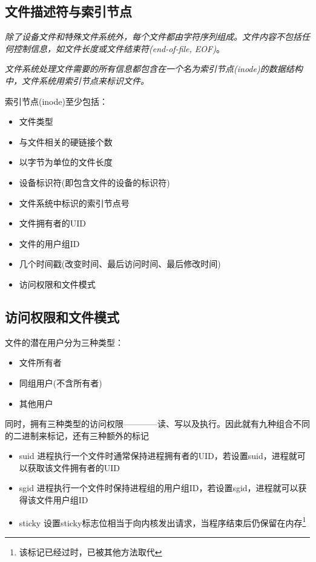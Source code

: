 \subsection{文件描述符与索引节点}

    \emph{除了设备文件和特殊文件系统外，每个文件都由字符序列组成。文件内容不包括任何控制信息，如文件长度或文件结束符(end-of-file, EOF)}。

    \emph{文件系统处理文件需要的所有信息都包含在一个名为索引节点(inode)的数据结构中，文件系统用索引节点来标识文件。}

    索引节点(inode)至少包括：

\begin{itemize}
    \item 文件类型
    \item 与文件相关的硬链接个数
    \item 以字节为单位的文件长度
    \item 设备标识符(即包含文件的设备的标识符)
    \item 文件系统中标识的索引节点号
    \item 文件拥有者的UID
    \item 文件的用户组ID
    \item 几个时间戳(改变时间、最后访问时间、最后修改时间)
    \item 访问权限和文件模式
\end{itemize}

\subsection{访问权限和文件模式}

    文件的潜在用户分为三种类型：

\begin{itemize}
    \item 文件所有者
    \item 同组用户(不含所有者)
    \item 其他用户
\end{itemize}

    同时，拥有三种类型的访问权限————读、写以及执行。因此就有九种组合不同的二进制来标记，还有三种额外的标记

\begin{itemize}
    \item suid
    \subitem 进程执行一个文件时通常保持进程拥有者的UID，若设置suid，进程就可以获取该文件拥有者的UID
    \item sgid 
    \subitem 进程执行一个文件时保持进程组的用户组ID，若设置sgid，进程就可以获得该文件用户组ID
    \item sticky
    \subitem 设置sticky标志位相当于向内核发出请求，当程序结束后仍保留在内存\footnote[1]{该标记已经过时，已被其他方法取代}
\end{itemize}


